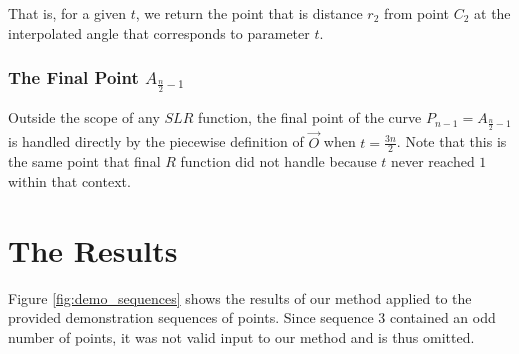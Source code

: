 \documentclass{article}
\begin{document}
That is, for a given $t$, we return the point that is distance $r_2$ from point $C_2$ at the interpolated angle that corresponds to parameter $t$.


\subsubsection{The Final Point $A_{\frac{n}{2}-1}$}
Outside the scope of any $SLR$ function, the final point of the curve $P_{n-1} = A_{\frac{n}{2}-1}$ is handled directly by the piecewise definition of $\overrightarrow{O}$ when $t = \frac{3n}{2}$. Note that this is the same point that final $R$ function did not handle because $t$ never reached $1$ within that context.

\section{The Results}
Figure \ref{fig:demo_sequences} shows the results of our method applied to the provided demonstration sequences of points. Since sequence 3 contained an odd number of points, it was not valid input to our method and is thus omitted.
\end{document}
